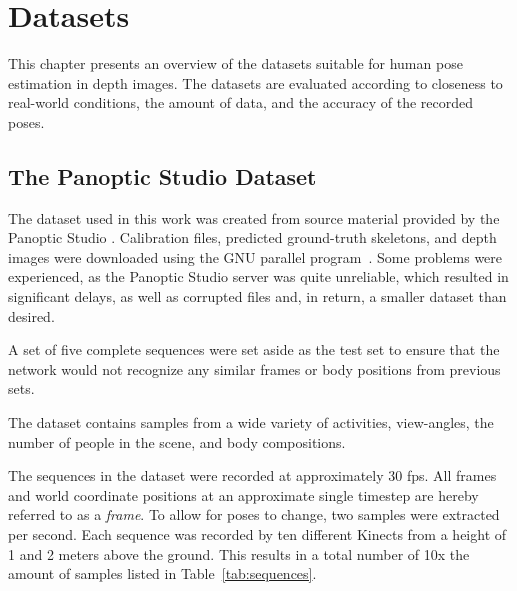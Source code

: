 \chapter{Datasets}

This chapter presents an overview of the datasets suitable for human pose estimation in depth images. The datasets are evaluated according to closeness to real-world conditions, the amount of data, and the accuracy of the recorded poses.


\section{The Panoptic Studio Dataset}

The dataset used in this work was created from source material provided by the Panoptic Studio \cite{Joo_2015_ICCV, Joo_2017_TPAMI}. Calibration files, predicted ground-truth skeletons, and depth images were downloaded using the GNU parallel program~\cite{Tange2011a}. Some problems were experienced, as the Panoptic Studio server was quite unreliable, which resulted in significant delays, as well as corrupted files and, in return, a smaller dataset than desired.

A set of five complete sequences were set aside as the test set to ensure that the network would not recognize any similar frames or body positions from previous sets.

The dataset contains samples from a wide variety of activities, view-angles, the number of people in the scene, and body compositions.

The sequences in the dataset were recorded at approximately 30 fps. All frames and world coordinate positions at an approximate single timestep are hereby referred to as a \emph{frame}. To allow for poses to change, two samples were extracted per second. Each sequence was recorded by ten different Kinects from a height of 1 and 2 meters above the ground. This results in a total number of 10x the amount of samples listed in Table~\ref{tab:sequences}.

